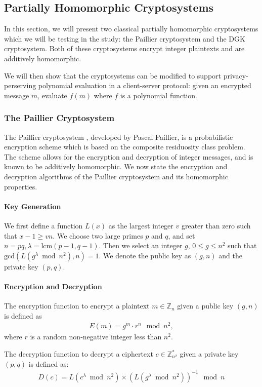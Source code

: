 \subsection{Partially Homomorphic Cryptosystems}
In this section, we will present two classical partially homomorphic cryptosystems which we will be testing in the study: the Paillier cryptosystem and the DGK cryptosystem. Both of these cryptosystems encrypt integer plaintexts and are additively homomorphic.

We will then show that the cryptosystems can be modified to support privacy-perserving polynomial evaluation in a client-server protocol: given an encrypted message $m$, evaluate $f(m)$ where $f$ is a polynomial function.

\subsubsection{The Paillier Cryptosystem}
The Paillier cryptosystem \cite{stern_public-key_1999}, developed by Pascal Paillier, is a probabilistic encryption scheme which is based on the composite residuosity class problem. The scheme allows for the encryption and decryption of integer messages, and is known to be additively homomorphic. We now state the encryption and decryption algorithms of the Paillier cryptosystem and its homomorphic properties.

\paragraph{Key Generation}
We first define a function $L(x)$ as the largest integer $v$ greater than zero such that $x-1 \geq vn$.
We choose two large primes $p$ and $q$, and set $n = pq, \lambda = \mathrm{lcm}(p-1,q-1)$.
Then we select an integer $g$, $0\leq g \leq n^2$ such that $\mathrm{gcd}(L(g^\lambda \bmod n^2), n) = 1$.
We denote the public key as $(g,n)$ and the private key $(p,q)$.

\paragraph{Encryption and Decryption}
The encryption function to encrypt a plaintext $m \in \mathbb{Z}_n$ given a public key $(g,n)$ is defined as
\begin{align*}
  E(m) = g^m \cdot r^n \mod{n^2},
\end{align*}
where $r$ is a random non-negative integer less than $n^2$.

The decryption function to decrypt a ciphertext $c \in \mathbb{Z}^\ast_{n^2}$ given a private key $(p,q)$ is defined as:
\begin{align*}
  D(c) = L(c^\lambda \bmod n^2) \times (L(g^\lambda \bmod n^2))^{-1} \mod n
\end{align*}

